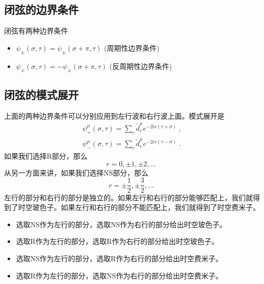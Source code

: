 \subsection{闭弦的边界条件}
闭弦有两种边界条件
\begin{itemize}
\item $\psi_{\pm}(\sigma,\tau) = \psi_{\pm}(\sigma+\pi,\tau)$ (周期性边界条件) 
\item $\psi_{\pm}(\sigma,\tau) = -\psi_{\pm}(\sigma+\pi,\tau)$ (反周期性边界条件)
\end{itemize}

\subsection{闭弦的模式展开}
上面的两种边界条件可以分别应用到左行波和右行波上面。模式展开是
\begin{equation}
\begin{aligned}
\psi^\mu_+(\sigma,\tau) = \sum_r \tilde d^\mu_r e^{- 2 i r (\tau+\sigma)}~, \\
\psi^\mu_-(\sigma,\tau) = \sum_r \tilde d^\mu_r e^{- 2 i r (\tau-\sigma)}~.
\end{aligned}
\end{equation}
如果我们选择R部分，那么
\begin{equation}
r = 0, \pm 1, \pm 2, \ldots~
\end{equation}
从另一方面来讲，如果我们选择NS部分，那么
\begin{equation}
r = \pm \frac{1}{2}, \pm \frac{3}{2}, \ldots~
\end{equation}
左行的部分和右行的部分是独立的。如果左行和右行的部分能够匹配上，我们就得到了时空玻色子。如果左行和右行的部分不能匹配上，我们就得到了时空费米子。
\begin{itemize}
\item 选取NS作为左行的部分，选取NS作为右行的部分给出时空玻色子。 
\item 选取R作为左行的部分，选取R作为右行的部分给出时空玻色子。
\item 选取NS作为左行的部分，选取R作为右行的部分给出时空费米子。
\item 选取R作为左行的部分，选取NS作为右行的部分给出时空费米子。
\end{itemize}

